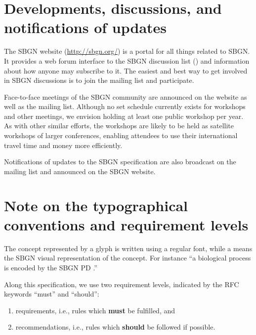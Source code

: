 \section{Developments, discussions, and notifications of updates}
\label{sec:discussions}

The SBGN website (\url{http://sbgn.org/}) is a portal for all things 
related to SBGN.  It provides a web forum interface to the SBGN discussion 
list () and information about how anyone 
may subscribe to it.  The easiest and best way to get involved in SBGN 
discussions is to join the mailing list and participate.

Face-to-face meetings of the SBGN community are announced on the website as 
well as the mailing list.  Although no set schedule currently exists for 
workshops and other meetings, we envision holding at least one public 
workshop per year.  As with other similar efforts, the workshops are likely 
to be held as satellite workshops of larger conferences, enabling attendees 
to use their international travel time and money more efficiently.

Notifications of updates to the SBGN specification are also broadcast on 
the mailing list and announced on the SBGN website.

\section{Note on the typographical conventions and requirement levels}
\label{sec:notes}
The concept represented by a glyph is written using a regular font, while a 
 means the SBGN visual representation of the concept. For 
instance ``a biological process is encoded by the SBGN PD .''

Along this specification, we use two requirement levels, indicated by the RFC keywords ``must'' and ``should'':
\begin{enumerate}
  \item requirements, i.e., rules which \textbf{must} be fulfilled, and
  \item recommendations, i.e., rules which \textbf{should} be followed if
  possible. 
\end{enumerate}